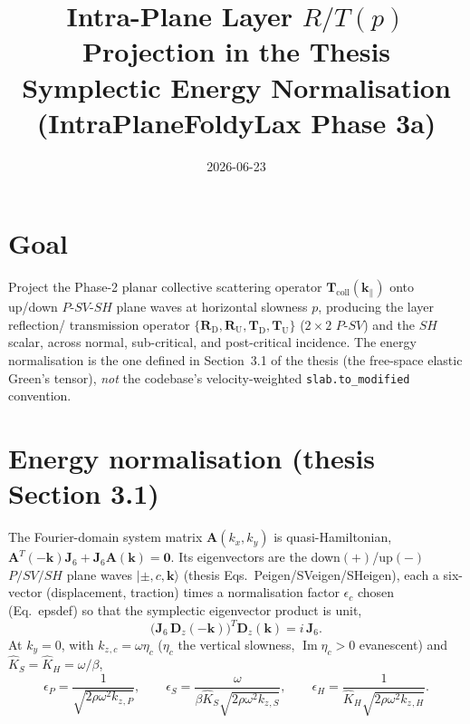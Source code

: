\documentclass[11pt]{article}
\title{Intra-Plane Layer $R/T(p)$ Projection in the Thesis Symplectic Energy Normalisation\\[2pt]
\large (IntraPlaneFoldyLax Phase 3a)}
\author{}
\date{2026-06-23}
\newcommand{\Rd}{\mathbf{R}_{\mathrm D}}
\newcommand{\Ru}{\mathbf{R}_{\mathrm U}}
\newcommand{\Td}{\mathbf{T}_{\mathrm D}}
\newcommand{\Tu}{\mathbf{T}_{\mathrm U}}
\newcommand{\kz}{k_{z}}
\begin{document}
\maketitle

\section{Goal}
Project the Phase-2 planar collective scattering operator $\mathbf{T}_{\mathrm{coll}}(\mathbf{k}_\parallel)$
onto up/down $P$-$SV$-$SH$ plane waves at horizontal slowness $p$, producing the layer reflection/
transmission operator $\{\Rd,\Ru,\Td,\Tu\}$ ($2\times2$ $P$-$SV$) and the $SH$ scalar, across normal,
sub-critical, and post-critical incidence. The energy normalisation is the one defined in
Section~3.1 of the thesis (the free-space elastic Green's tensor), \emph{not} the codebase's
velocity-weighted \texttt{slab.to\_modified} convention.

\section{Energy normalisation (thesis Section 3.1)}
The Fourier-domain system matrix $\mathbf{A}(k_x,k_y)$ is quasi-Hamiltonian,
$\mathbf{A}^{T}(-\mathbf{k})\mathbf{J}_6+\mathbf{J}_6\mathbf{A}(\mathbf{k})=\mathbf{0}$.
Its eigenvectors are the down$(+)$/up$(-)$ $P/SV/SH$ plane waves $\lvert\pm,c,\mathbf{k}\rangle$
(thesis Eqs.~Peigen/SVeigen/SHeigen), each a six-vector (displacement, traction) times a
normalisation factor $\epsilon_c$ chosen (Eq.~epsdef) so that the symplectic eigenvector product
is unit,
\begin{equation}
\bigl(\mathbf{J}_6\,\mathbf{D}_z(-\mathbf{k})\bigr)^{T}\mathbf{D}_z(\mathbf{k})=i\,\mathbf{J}_6 .
\end{equation}
At $k_y=0$, with $\kz{}_{,c}=\omega\eta_c$ ($\eta_c$ the vertical slowness, $\operatorname{Im}\eta_c>0$
evanescent) and $\hat K_S=\hat K_H=\omega/\beta$,
\begin{equation}
\epsilon_P=\frac{1}{\sqrt{2\rho\omega^2\kz{}_{,P}}},\qquad
\epsilon_S=\frac{\omega}{\beta\hat K_S\sqrt{2\rho\omega^2\kz{}_{,S}}},\qquad
\epsilon_H=\frac{1}{\hat K_H\sqrt{2\rho\omega^2\kz{}_{,H}}} .
\end{equation}
\end{document}
